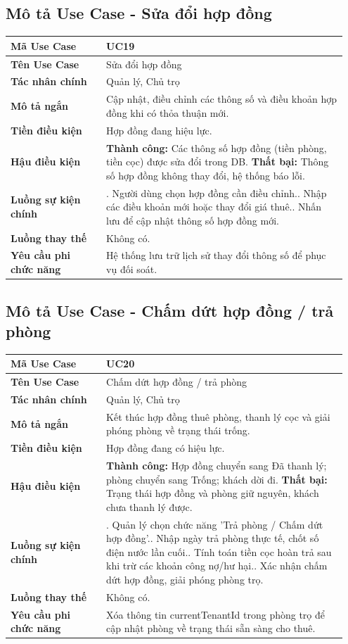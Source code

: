 \documentclass[a4paper,oneside]{report}
\begin{document}
\subsection{Mô tả Use Case - Sửa đổi hợp đồng}

\begin{longtable}[]{@{}>{\RaggedRight\arraybackslash}p{0.27\linewidth}>{\RaggedRight\arraybackslash}p{0.68\linewidth}@{}}
\toprule
\textbf{Mã Use Case} & UC19\tabularnewline
\midrule
\endhead
\textbf{Tên Use Case} & Sửa đổi hợp đồng\tabularnewline
\textbf{Tác nhân chính} & Quản lý, Chủ trọ\tabularnewline
\textbf{Mô tả ngắn} & Cập nhật, điều chỉnh các thông số và điều khoản
hợp đồng khi có thỏa thuận mới.\tabularnewline
\textbf{Tiền điều kiện} & Hợp đồng đang hiệu lực.\tabularnewline
\textbf{Hậu điều kiện} & \textbf{Thành công:} Các thông số hợp đồng (tiền phòng, tiền cọc) được sửa đổi trong DB.\newline 
\textbf{Thất bại:} Thông số hợp đồng không thay đổi, hệ thống báo lỗi.\tabularnewline
\textbf{Luồng sự kiện chính} & 1. Người dùng chọn hợp
đồng cần điều chỉnh.\newline 2. Nhập các điều khoản mới hoặc thay
đổi giá thuê.\newline 3. Nhấn lưu để cập nhật thông số hợp đồng
mới.\tabularnewline
\textbf{Luồng thay thế} & Không có.\tabularnewline
\textbf{Yêu cầu phi chức năng} & Hệ thống lưu trữ lịch sử thay đổi thông
số để phục vụ đối soát.\tabularnewline
\bottomrule
\end{longtable}

\subsection{Mô tả Use Case - Chấm dứt hợp đồng / trả phòng}

\begin{longtable}[]{@{}>{\RaggedRight\arraybackslash}p{0.27\linewidth}>{\RaggedRight\arraybackslash}p{0.68\linewidth}@{}}
\toprule
\textbf{Mã Use Case} & UC20\tabularnewline
\midrule
\endhead
\textbf{Tên Use Case} & Chấm dứt hợp đồng / trả phòng\tabularnewline
\textbf{Tác nhân chính} & Quản lý, Chủ trọ\tabularnewline
\textbf{Mô tả ngắn} & Kết thúc hợp đồng thuê phòng, thanh lý cọc và giải
phóng phòng về trạng thái trống.\tabularnewline
\textbf{Tiền điều kiện} & Hợp đồng đang có hiệu lực.\tabularnewline
\textbf{Hậu điều kiện} & \textbf{Thành công:} Hợp đồng chuyển sang Đã thanh lý; phòng chuyển sang Trống; khách dời đi.\newline 
\textbf{Thất bại:} Trạng thái hợp đồng và phòng giữ nguyên, khách chưa thanh lý được.\tabularnewline
\textbf{Luồng sự kiện chính} & 1. Quản lý chọn chức
năng 'Trả phòng / Chấm dứt hợp đồng'.\newline 2. Nhập ngày trả
phòng thực tế, chốt số điện nước lần cuối.\newline 3. Tính toán
tiền cọc hoàn trả sau khi trừ các khoản công nợ/hư hại.\newline 4.
Xác nhận chấm dứt hợp đồng, giải phóng phòng trọ.\tabularnewline
\textbf{Luồng thay thế} & Không có.\tabularnewline
\textbf{Yêu cầu phi chức năng} & Xóa thông tin currentTenantId trong
phòng trọ để cập nhật phòng về trạng thái sẵn sàng cho
thuê.\tabularnewline
\bottomrule
\end{longtable}
\end{document}
